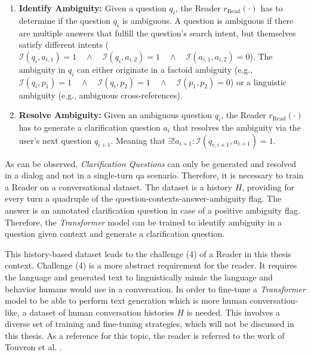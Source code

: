 \begin{enumerate}
    \item \textbf{Identify Ambiguity:} Given a question $q_i$, the Reader $r_{\text{Read}}(\cdot)$ has to determine if the question $q_i$ is ambiguous. A question is ambiguous if there are multiple answers that fulfill the question's search intent, but themselves satisfy different intents ($\mathcal{I}(q_{i}, a_{i,1}) = 1 \quad \allowbreak \land \quad \allowbreak \mathcal{I}(q_{i}, a_{i,2}) = 1 \quad \allowbreak \land \quad \allowbreak \mathcal{I}(a_{i,1},a_{i,2}) = 0$). The ambiguity in $q_i$ can either originate in a factoid ambiguity (e.g., $\mathcal{I}(q_{i}, p_1) = 1 \quad \land \quad \mathcal{I}(q_{i}, p_2) = 1 \quad \land \quad \mathcal{I}(p_1, p_2) = 0$) or a linguistic ambiguity (e.g., ambiguous cross-references).
    \item \textbf{Resolve Ambiguity:} Given an ambiguous question $q_i$, the Reader $r_{\text{Read}}(\cdot)$ has to generate a clarification question $a_i$ that resolves the ambiguity via the user's next question $q_{i+1}$. Meaning that $\exists! a_{i+1} : \mathcal{I}(q_{c,i+1}, a_{i+1}) = 1$.
\end{enumerate}

As can be observed, \textit{Clarification Questions} can only be generated and resolved in a dialog and not in a single-turn \gls{qa} scenario. Therefore, it is necessary to train a Reader on a conversational dataset. The dataset is a history $H$, providing for every turn a quadruple of the question-contexts-answer-ambiguity flag. The answer is an annotated clarification question in case of a positive ambiguity flag. Therefore, the \textit{Transformer} model can be trained to identify ambiguity in a question given context and generate a clarification question.

This history-based dataset leads to the challenge (4) of a Reader in this thesis context. Challenge (4) is a more abstract requirement for the reader. It requires the language and generated text to linguistically mimic the language and behavior humans would use in a conversation. In order to fine-tune a \textit{Transformer} model to be able to perform text generation which is more human conversation-like, a dataset of human conversation histories $H$ is needed. This involves a diverse set of training and fine-tuning strategies, which will not be discussed in this thesis. As a reference for this topic, the reader is referred to the work of Touvron et al. \cite{touvron_llama_2023}.

